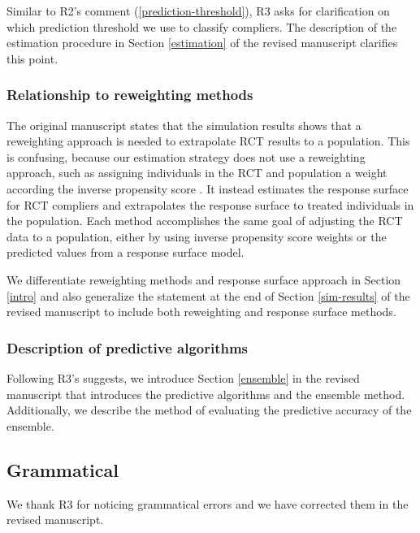 \documentclass[hidelinks,12pt,letterpaper]{article}
\begin{document}
Similar to R2's comment (\ref{prediction-threshold}), R3 asks for clarification on which prediction threshold we use to classify compliers. The description of the estimation procedure in Section \ref{estimation} of the revised manuscript clarifies this point. 

\subsubsection{Relationship to reweighting methods}

The original manuscript states that the simulation results shows that a reweighting approach is needed to extrapolate RCT results to a population. This is confusing, because our estimation strategy does not use a reweighting approach, such as assigning individuals in the RCT and population a weight according the inverse propensity score \citep{stuart2011use}. It instead estimates the response surface for RCT compliers and extrapolates the response surface to treated individuals in the population. Each method accomplishes the same goal of adjusting the RCT data to a population, either by using inverse propensity score weights or the predicted values from a response surface model. 

We differentiate reweighting methods and response surface approach in Section \ref{intro} and also generalize the statement at the end of Section \ref{sim-results} of the revised manuscript to include both reweighting and response surface methods. 

\subsubsection{Description of predictive algorithms}

Following R3's suggests, we introduce Section \ref{ensemble} in the revised manuscript that introduces the predictive algorithms and the ensemble method. Additionally, we describe the method of evaluating the predictive accuracy of the ensemble. 

\subsection{Grammatical}

We thank R3 for noticing grammatical errors and we have corrected them in the revised manuscript. 


\printbibliography
\end{document}
